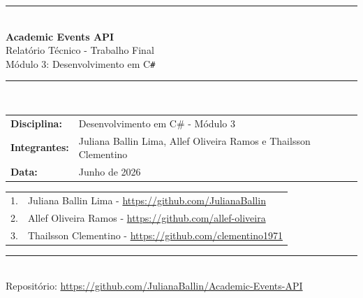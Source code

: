 \documentclass[11pt, a4paper, oneside]{article}
\begin{document}
\begin{titlepage}
\centering
\vspace*{20mm}

{\color{apiblue}\rule{\linewidth}{2pt}}\\[6mm]

{\Huge\bfseries\color{apiblue} Academic Events API}\\[4mm]
{\Large\color{apidark} Relatório Técnico - Trabalho Final}\\[3mm]
{\large\color{apidark} Módulo 3: Desenvolvimento em C\texttt{\#}}\\[8mm]

{\color{apilightblue}\rule{\linewidth}{1pt}}\\[10mm]

\begin{tabular}{ll}
\textbf{Disciplina:} & Desenvolvimento em C\# - Módulo 3 \\[2mm]
\textbf{Integrantes:} & Juliana Ballin Lima, Allef Oliveira Ramos e Thailsson Clementino \\[2mm]
\textbf{Data:}       & Junho de 2026 \\[2mm]
\end{tabular}

\vspace{10mm}

\begin{tcolorbox}[requisito, title={Autoria do Relatório}, width=0.85\linewidth]
\begin{tabular}{ll}
1. & Juliana Ballin Lima - \url{https://github.com/JulianaBallin} \\
2. & Allef Oliveira Ramos - \url{https://github.com/allef-oliveira} \\
3. & Thailsson Clementino - \url{https://github.com/clementino1971} \\
\end{tabular}
\end{tcolorbox}

\vfill

{\color{apiblue}\rule{\linewidth}{2pt}}\\[4mm]
{\small\color{apidark} Repositório: \url{https://github.com/JulianaBallin/Academic-Events-API}}
\end{titlepage}

\tableofcontents
\newpage
\end{document}
